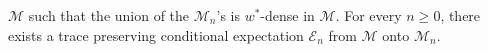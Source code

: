\documentclass[12pt]{amsart}
\numberwithin{equation}{section}
\begin{document}
$\mathcal{M}$ such that the union of the $\mathcal{M}_n$'s is $w^*$-dense in $\mathcal{M}$. For every $n\geq 0$, there exists a trace preserving   conditional expectation $\mathcal{E}_{n}$ from  $\mathcal{M}$ onto  $\mathcal{M}_n.$


\end{document}

